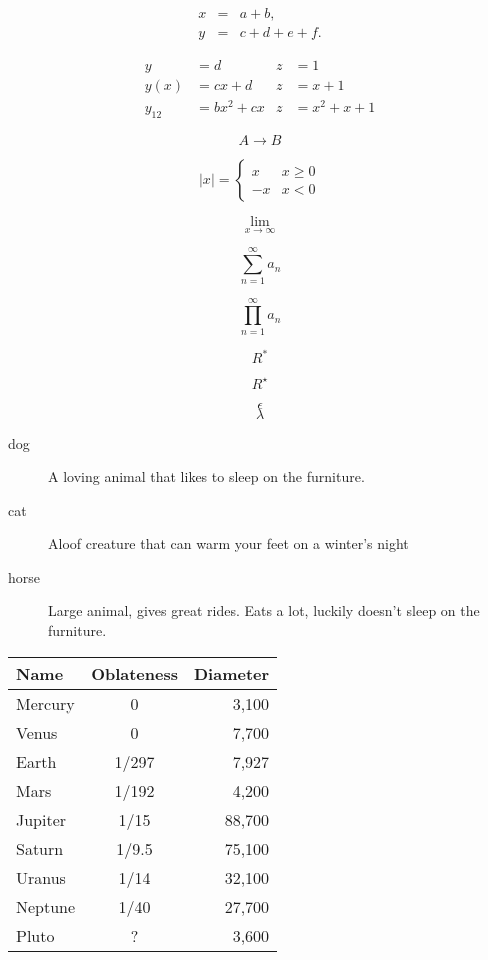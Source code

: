 \documentclass{article}
\begin{document}
\begin{eqnarray}
x &=& a + b, \label{x7} \\
y &=& c + d + e + f. \label{y7}
\end{eqnarray}



\begin{align*}
y &= d & z &= 1\\
y(x) &= cx+d & z &= x+1\\
y_{12} &= bx^2+cx & z &= x^2+x+1
\end{align*}

$$
A \to B
$$

$$
|x| = 
\begin{cases}
x & x\ge 0\\
-x & x<0
\end{cases}
$$

$$
\lim_{x\to \infty}
$$

$$
\sum_{n=1}^{\infty}a_n
$$

$$
\prod_{n=1}^{\infty}a_n
$$

$$
R^{\ast}
$$

$$
R^{\star}
$$

$$
\epsilon
$$
$$
\lambda
$$



\begin{description}
\item[dog] A loving animal that
likes to sleep on the furniture.
\item[cat] Aloof creature that can
warm your feet on a winter’s night
\item[horse] Large animal, gives
great rides. Eats a lot, luckily
doesn’t sleep on the furniture.
\end{description}




\begin{center}
\begin{tabular}{|l|c|r|} %
\hline %
Name & Oblateness & Diameter \\
\hline
Mercury & 0 & 3,100 \\
Venus & 0 & 7,700 \\
Earth & 1/297 & 7,927 \\
Mars & 1/192 & 4,200 \\
Jupiter & 1/15 & 88,700 \\
Saturn & 1/9.5 & 75,100 \\
Uranus & 1/14 & 32,100 \\
Neptune & 1/40 & 27,700 \\
Pluto & ? & 3,600\\
\hline
\end{tabular}
\end{center}
\end{document}
